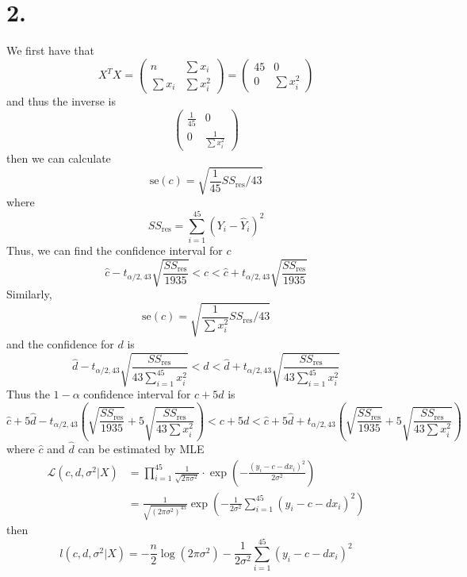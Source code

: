 \documentclass[11pt]{article}
\theoremstyle{mystyle}
\theoremstyle{definition}
\begin{document}
\section*{2.}
We first have that 
\[
  X^T X = 
  \begin{pmatrix}
    n & \sum x_i \\
    \sum x_i & \sum x_i^2
  \end{pmatrix}
  = 
  \begin{pmatrix}
    45 & 0 \\
    0 & \sum x_i^2
  \end{pmatrix}
\]
and thus the inverse is 
\[
  \begin{pmatrix}
    \displaystyle\frac{1}{45} & 0 \\
    0 & \displaystyle\frac{1}{\sum x_i^2}
  \end{pmatrix}
\]
then we can calculate 
\[
  \text{se}(c) = \sqrt{\displaystyle\frac{1}{45} SS_\text{res} / 43}
\]
where
\[
  SS_\text{res} = \sum_{i=1}^{45} (Y_i - \hat Y_i)^2
\]
Thus, we can find the confidence interval for $c$
\[
  \hat c - t_{\alpha/2, 43} \sqrt{\displaystyle\frac{SS_\text{res}}{1935}} < c < \hat c + t_{\alpha/2, 43} \sqrt{\displaystyle\frac{SS_\text{res}}{1935}}
\]
Similarly, 
\[
  \text{se}(c) = \sqrt{\displaystyle\frac{1}{\sum x_i^2} SS_\text{res} / 43}
\]
and the confidence for $d$ is 
\[
  \hat d - t_{\alpha/2, 43} \sqrt{\displaystyle\frac{SS_\text{res}}{43 \sum_{i=1}^{45} x_i^2}} < d < \hat d + t_{\alpha/2, 43} \sqrt{\displaystyle\frac{SS_\text{res}}{43 \sum_{i=1}^{45} x_i^2}}
\]
Thus the $1-\alpha$ confidence interval for $c + 5d$ is
\[
  \hat c + 5\hat d - t_{\alpha/2,43} \left(\sqrt{\displaystyle\frac{SS_\text{res}}{1935}} + 5\sqrt{\displaystyle\frac{SS_\text{res}}{43 \sum x_i^2}} \right) < c + 5d < \hat c + 5\hat d + t_{\alpha/2,43} \left(\sqrt{\displaystyle\frac{SS_\text{res}}{1935}} + 5\sqrt{\displaystyle\frac{SS_\text{res}}{43 \sum x_i^2}} \right)
\]
where $\hat c$ and $\hat d$ can be estimated by MLE
\begin{align*}
  \mathcal{L}(c,d, \sigma^2 | X) &
  = \prod_{i=1}^{45} \displaystyle\frac{1}{\sqrt{2\pi\sigma^2}} \cdot \exp \left(-\displaystyle\frac{(y_i - c - d x_i)^2}{2\sigma^2}\right) \\
  &= \displaystyle\frac{1}{\sqrt{(2\pi\sigma^2)^{45}}} \exp \left(-\displaystyle\frac{1}{2\sigma^2} \sum_{i=1}^{45} (y_i - c - d x_i)^2 \right)
\end{align*}
then 
\[
  l(c,d,\sigma^2 | X) = -\displaystyle\frac{n}{2} \log(2\pi \sigma^2) - \displaystyle\frac{1}{2\sigma^2} \sum_{i=1}^{45} (y_i - c - d x_i)^2 
\]
\end{document}
